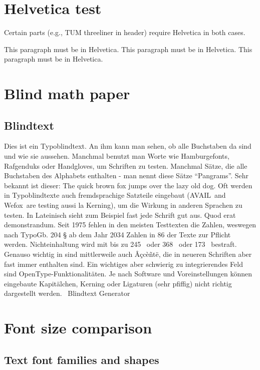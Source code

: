 \documentclass{scrartcl}
\begin{document}
\section{Helvetica test}

Certain parts (e.g., TUM threeliner in header) require Helvetica in both
cases.

\begingroup
\theTUMFont
This paragraph must be in Helvetica. This paragraph must be in Helvetica.
This paragraph must be in Helvetica.
\endgroup

\section{Blind math paper}

\blindmathpaper

\subsection{Blindtext}
Dies ist ein Typoblindtext. An ihm kann man sehen, ob alle Buchstaben da sind
und wie sie aussehen. Manchmal benutzt man Worte wie Hamburgefonts,
Rafgenduks oder Handgloves, um Schriften zu testen. Manchmal Sätze, die alle
Buchstaben des Alphabets enthalten - man nennt diese Sätze
\enquote{Pangrams}. Sehr bekannt ist dieser: The quick brown fox jumps over
the lazy old dog. Oft werden in Typoblindtexte auch fremdsprachige Satzteile
eingebaut (AVAIL\textregistered\ and Wefox\texttrademark\ are testing aussi
la Kerning), um die Wirkung in anderen Sprachen zu testen. In Lateinisch
sieht zum Beispiel fast jede Schrift gut aus. Quod erat demonstrandum. Seit
1975 fehlen in den meisten Testtexten die Zahlen, weswegen nach TypoGb. 204 §
ab dem Jahr 2034 Zahlen in 86 der Texte zur Pflicht werden. Nichteinhaltung
wird mit bis zu 245 \texteuro\ oder 368 \textdollar\ oder 173 \textsterling\
bestraft. Genauso wichtig in sind mittlerweile auch Â\c{c}cè\~{n}t\"{e}, die
in neueren Schriften aber fast immer enthalten sind. Ein wichtiges aber
schwierig zu integrierendes Feld sind OpenType-Funktionalitäten. Je nach
Software und Voreinstellungen können eingebaute Kapitälchen, Kerning oder
Ligaturen (sehr pfiffig) nicht richtig dargestellt werden.
\textcopyright~Blindtext Generator

\section{Font size comparison}

\subsection{Text font families and shapes}
\end{document}
